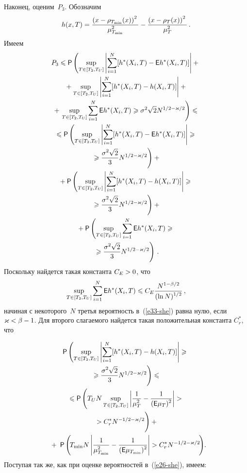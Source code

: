 \begin{multicols}{2}
Наконец, оценим~$P_3$. Обозначим
$$
h(x,T)=\displaystyle\frac{\displaystyle \left(x-\rho_{T_{\min}}(x)\right)^2\mathstrut}{\displaystyle \mu_{T_{\min}}^2\mathstrut}-\displaystyle\frac{\displaystyle \left(x-\rho_T(x)\right)^2\mathstrut}{\displaystyle \mu_T^2\mathstrut}\,.
$$
Имеем
\begin{multline}
P_3\leqslant{\sf P}\left(\sup\limits_{T\in[T_2,T_U]}\left\vert\sum\limits_{i=1}^N[h^*(X_i,T)-{\sf E}h^*(X_i,T)]\right\vert+{}\right.\\
{}+\sup\limits_{T\in[T_2,T_U]}\left\vert\sum\limits_{i=1}^N[h^*(X_i,T)-h(X_i,T)]\right\vert+{}\\{}+
\left.\sup\limits_{T\in[T_2,T_U]}\sum\limits_{i=1}^N{\sf E}h^*(X_i,T)\geqslant \sigma^2\sqrt{2}N^{1/2-\varkappa/2}\right)\leqslant{}\\
{}\leqslant{\sf P}\left(\sup\limits_{T\in[T_2,T_U]}\left\vert\sum\limits_{i=1}^N[h^*(X_i,T)-
{\sf E}h^*(X_i,T)]\right\vert\geqslant{}\right.\\
\left.{}\geqslant \displaystyle\frac{\displaystyle \sigma^2\sqrt{2}\mathstrut}{\displaystyle 3\mathstrut}N^{1/2-\varkappa/2}\right)+{}\\
{}+{\sf P}\left(\sup\limits_{T\in[T_2,T_U]}\left\vert\sum\limits_{i=1}^N[h^*(X_i,T)-h(X_i,T)]\right\vert\geqslant{}\right.\\
\left.{}\geqslant 
\displaystyle\frac{\displaystyle \sigma^2\sqrt{2}\mathstrut}{\displaystyle 3\mathstrut}N^{1/2-\varkappa/2}\right)+{}\\
{}+{\sf P}\left(\sup\limits_{T\in[T_2,T_U]}\sum\limits_{i=1}^N{\sf E}h^*(X_i,T)\geqslant {}\right.\\
\left.{}\geqslant
\displaystyle\frac{\displaystyle \sigma^2\sqrt{2}\mathstrut}{\displaystyle 3\mathstrut}N^{1/2-\varkappa/2}\right)\,.\label{e33-she}
\end{multline}
Поскольку найдется такая константа $C_E\hm>0$, что
$$
\sup\limits_{T\in[T_2,T_U]}\sum\limits_{i=1}^N{\sf E}h^*(X_i,T)\leqslant C_E \displaystyle\frac{\displaystyle N^{1-\beta/2}\mathstrut}{\displaystyle (\ln N)^{1/2}\mathstrut}\,,
$$
начиная с некоторого~$N$ третья вероятность в~(\ref{e33-she}) равна нулю, если $\varkappa\hm<\beta\hm-1$. 
Для второго слагаемого найдется такая положительная константа $C^*_r$, что

\noindent
\begin{multline*}
{\sf P}\left(\sup\limits_{T\in[T_2,T_U]}\abs{\sum\limits_{i=1}^N[h^*(X_i,T)-h(X_i,T)]}\geqslant {}\right.\\
\left.{}\geqslant
\fr{\sigma^2\sqrt{2}}{3}N^{1/2-\varkappa/2}\right)\leqslant{}\\
{}\leqslant{\sf P}\left(T_U N\sup\limits_{T\in[T_2,T_U]}\abs{\fr{1}{\mu^2_T}-
\fr{1}{({\sf E}\mu_T)^2}}>{}\right.\\
\left.{}>C^*_r N^{-1/2-\varkappa/2}
\vphantom{T_U N\sup\limits_{T\in[T_2,T_U]}\abs{\fr{1}{\mu^2_T}-
\fr{1}{({\sf E}\mu_T)^2}}}
\right)+{}\\
{}+\;{\sf P}\left(\!T_{\min}N\abs{\fr{1}{\mu^2_{T_{\min}}}-\fr{1}{({\sf E}\mu_{T_{\min}})^2}}>C^*_r N^{-1/2-\varkappa/2}\!\right)\!.\hspace*{-6pt}
\end{multline*}
Поступая так же, как при оценке вероятностей в~(\ref{e26-she}), имеем:


\end{multicols}
